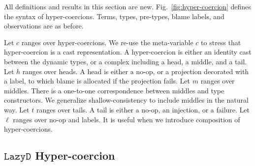 \documentclass[acmsmall,review,anonymous]{acmart}\settopmatter{printfolios=true,printccs=false,printacmref=false}
\newcommand{\figref}[1]{Fig.~\ref{#1}}
\newcommand{\lazyD}{$\mathtt{Lazy D}$}
\begin{document}
All definitions and results in this section are new.
\figref{fig:hyper-coercion} defines the syntax of hyper-coercions.
Terms, types, pre-types, blame labels, and observations are as before.

Let $ c $ ranges over hyper-coercions. We re-use the meta-variable $ c $ to 
stress that hyper-coercion is a cast representation. A hyper-coercion is either 
an identity cast between the dynamic types, or a complex including a head, a 
middle, and a tail. 
Let $ h $ ranges over heads. A head is either a no-op, or a projection 
decorated with a label, to which blame is allocated if the projection fails. 
Let $ m $ ranges over middles. There is a one-to-one 
correspondence between middles and type constructors. 
We generalize shallow-consistency to include middles in the natural way.
Let $ t $ ranges over tails. A tail is either a no-op, an injection, or a 
failure. 
Let $ \ell $ ranges over no-op and labels. It is useful when we introduce 
composition of hyper-coercions.

\subsection{\lazyD{} Hyper-coercion}
\end{document}

